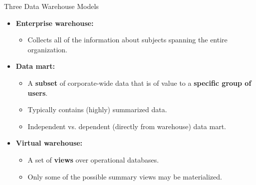 \begin{frame}{Three Data Warehouse Models}
	\begin{itemize}
		\item \textbf{\color{airforceblue}Enterprise warehouse:}
		      \begin{itemize}
			      \item Collects all of the information about subjects spanning the entire organization.
		      \end{itemize}
		\item \textbf{\color{airforceblue}Data mart:}
		      \begin{itemize}
			      \item A \textbf{\color{airforceblue}subset} of corporate-wide data that is of value to a \textbf{\color{airforceblue}specific group of users}.
			      \item Typically contains (highly) summarized data.
			      \item Independent vs. dependent (directly from warehouse) data mart.
		      \end{itemize}
		\item \textbf{\color{airforceblue}Virtual warehouse:}
		      \begin{itemize}
			      \item A set of \textbf{\color{airforceblue}views} over operational databases.
			      \item Only some of the possible summary views may be materialized.
		      \end{itemize}
	\end{itemize}
\end{frame}

